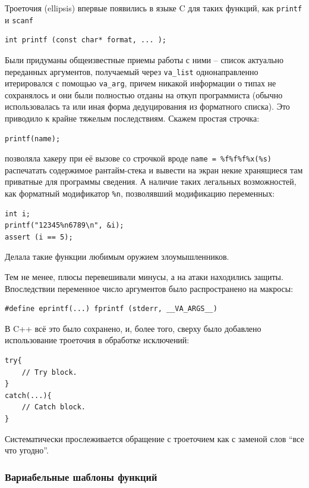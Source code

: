 \documentclass[a4paper,12pt,oneside]{article}
\begin{document}
Троеточия (ellipsis) впервые появились в языке C для таких функций, как \lstinline!printf! и \lstinline!scanf! 

\begin{lstlisting}
int printf (const char* format, ... );
\end{lstlisting}

Были придуманы общеизвестные приемы работы с ними -- список актуально переданных аргументов, получаемый через \lstinline!va_list! однонаправленно итерировался с помощью \lstinline!va_arg!, причем никакой информации о типах не сохранялось и они были полностью отданы на откуп программиста (обычно использовалась та или иная форма дедуцирования из форматного списка). Это приводило к крайне тяжелым последствиям. Скажем простая строчка:

\begin{lstlisting}
printf(name);
\end{lstlisting}

позволяла хакеру при её вызове со строчкой вроде \lstinline!name = %f%f%f%x(%s)! распечатать содержимое рантайм-стека и вывести на экран некие хранящиеся там приватные для программы сведения. А наличие таких легальных возможностей, как форматный модификатор \lstinline!%n!, позволявший модификацию переменных:

\begin{lstlisting}
int i;
printf("12345%n6789\n", &i);
assert (i == 5);
\end{lstlisting}

Делала такие функции любимым оружием злоумышленников. 

Тем не менее, плюсы перевешивали минусы, а на атаки находились защиты. Впоследствии переменное число аргументов было распространено на макросы:

\begin{lstlisting}
#define eprintf(...) fprintf (stderr, __VA_ARGS__)
\end{lstlisting}

В C++ всё это было сохранено, и, более того, сверху было добавлено использование троеточия в обработке исключений:

\begin{lstlisting}
try{
    // Try block.
}
catch(...){
    // Catch block.
}
\end{lstlisting}

Систематически прослеживается обращение с троеточием как с заменой слов ``все что угодно''.

\subsubsection{Вариабельные шаблоны функций}
\end{document}
